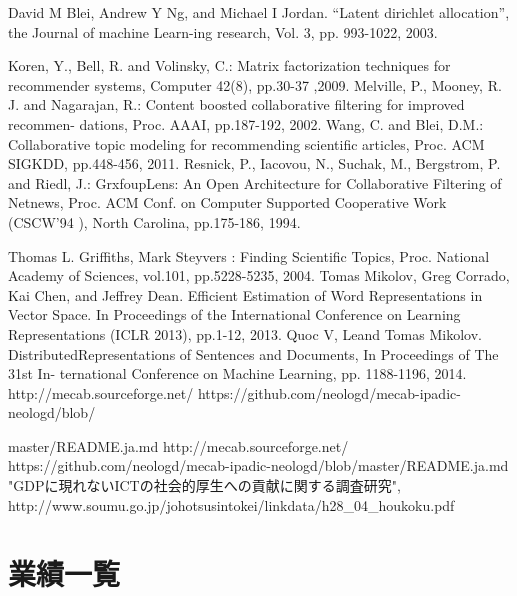 \documentclass[a4paper,11pt,oneside,openany]{jsbook}
\begin{document}
\begin{thebibliography}{99}
	
	David M Blei, Andrew Y Ng, and Michael I Jordan. “Latent dirichlet allocation”, the Journal of machine Learn-ing research, Vol. 3, pp. 993-1022, 2003.
	
	Koren, Y., Bell, R. and Volinsky, C.: Matrix factorization techniques for recommender systems, Computer 42(8), pp.30-37 ,2009.
	Melville, P., Mooney, R. J. and Nagarajan, R.: Content boosted collaborative filtering for improved recommen- dations, Proc. AAAI, pp.187-192, 2002.
	Wang, C. and Blei, D.M.: Collaborative topic modeling for recommending scientific articles, Proc. ACM SIGKDD, pp.448-456, 2011.
	Resnick, P., Iacovou, N., Suchak, M., Bergstrom, P. and Riedl, J.: GrxfoupLens: An Open Architecture for Collaborative Filtering of Netnews, Proc. ACM Conf. on Computer Supported Cooperative Work (CSCW’94 ), North Carolina, pp.175-186, 1994.
	
	Thomas L. Griffiths, Mark Steyvers : Finding Scientific Topics, Proc. National Academy of Sciences, vol.101, pp.5228-5235, 2004.
	Tomas Mikolov, Greg Corrado, Kai Chen, and Jeffrey Dean. Efficient Estimation of Word Representations in Vector Space. In Proceedings of the International Conference on Learning Representations (ICLR 2013), pp.1-12, 2013.
	Quoc V, Leand Tomas Mikolov. DistributedRepresentations of Sentences and Documents, In Proceedings of The 31st In- ternational Conference on Machine Learning, pp. 1188-1196, 2014.	
	http://mecab.sourceforge.net/
	https://github.com/neologd/mecab-ipadic-neologd/blob/
	\par master/README.ja.md
	http://mecab.sourceforge.net/
	https://github.com/neologd/mecab-ipadic-neologd/blob/master/README.ja.md
	"GDPに現れないICTの社会的厚生への貢献に関する調査研究", http://www.soumu.go.jp/johotsusintokei/linkdata/h28\_04\_houkoku.pdf
	
	
\end{thebibliography}

\chapter*{業績一覧}
\end{document}
